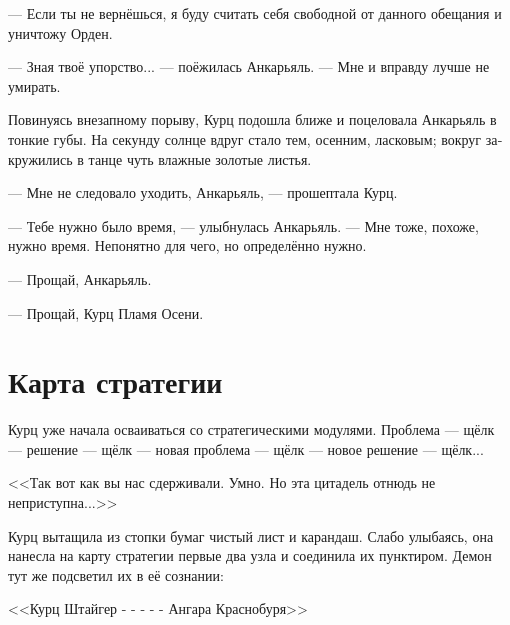 \documentclass[a4paper,10pt,fleqn]{book}\usepackage{polyglossia}\setdefaultlanguage[babelshorthands=true]{russian}\setotherlanguage{english}\defaultfontfeatures{Ligatures=TeX,Mapping=tex-text}\usepackage{xcolor}\newcommand{\ml}[3]{#2}
\begin{document}
--- Если ты не вернёшься, я буду считать себя свободной от данного обещания и уничтожу Орден.

--- Зная твоё упорство... --- поёжилась Анкарьяль.
--- Мне и вправду лучше не умирать.

Повинуясь внезапному порыву, Курц подошла ближе и поцеловала Анкарьяль в тонкие губы.
На секунду солнце вдруг стало тем, осенним, ласковым;
вокруг закружились в танце чуть влажные золотые листья.

--- Мне не следовало уходить, Анкарьяль, --- прошептала Курц.

--- Тебе нужно было время, --- улыбнулась Анкарьяль.
--- Мне тоже, похоже, нужно время.
Непонятно для чего, но определённо нужно.

--- Прощай, Анкарьяль.

--- Прощай, Курц Пламя Осени.

\section{Карта стратегии}

Курц уже начала осваиваться со стратегическими модулями.
Проблема --- щёлк --- решение --- щёлк --- новая проблема --- щёлк --- новое решение --- щёлк...

<<Так вот как вы нас сдерживали.
Умно.
Но эта цитадель отнюдь не неприступна...>>

Курц вытащила из стопки бумаг чистый лист и карандаш.
Слабо улыбаясь, она нанесла на карту стратегии первые два узла и соединила их пунктиром.
\ml{$0$}
{Демон тут же подсветил их в её сознании:}
{The daemon immediately highlighted them in her mind:}

\ml{$0$}
{<<Курц Штайгер - - - - - Ангара Краснобуря>>}
{\textit{Kurz Steiger - - - - - Angara of Redbreeze}}
\end{document}
